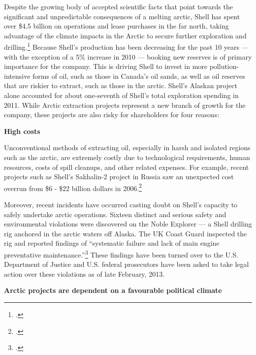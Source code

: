 Despite the growing body of accepted scientific facts that point towards the significant and unpredictable consequences of a melting arctic, Shell has spent over \$4.5 billion on operations and lease purchases in the far north, taking advantage of the climate impacts in the Arctic to secure further exploration and drilling.\footcite{ShellSuspends}
Because Shell's production has been decreasing for the past 10 years --- with the exception of a 5\% increase in 2010  --- booking new reserves is of primary importance for the company.
This is driving Shell to invest in more pollution-intensive forms of oil, such as those in Canada's oil sands, as well as oil reserves that are riskier to extract, such as those in the arctic.
Shell's Alaskan project alone accounted for about one-seventh of Shell's total exploration spending in 2011. 
While Arctic extraction projects represent a new branch of growth for the company, these projects are also risky for shareholders for four reasons:



\textbf{High costs} 



Unconventional methods of extracting oil, especially in harsh and isolated regions such as the arctic, are extremely costly due to technological requirements, human resources, costs of spill cleanups, and other related expenses. 
For example, recent projects such as Shell's Sakhalin-2 project in Russia saw an unexpected cost overrun from \$6 - \$22 billion dollars in 2006.\footcite[For more on these four central risk factors see][]{OutInTheCold_2012}



Moreover, recent incidents have occurred casting doubt on Shell's capacity to safely undertake arctic operations. 
Sixteen distinct and serious safety and environmental violations were discovered on the Noble Explorer --- a Shell drilling rig anchored in the arctic waters off Alaska. 
The UK Coast Guard inspected the rig and reported findings of ``systematic failure and lack of main engine preventative maintenance.''\footcite{RigFindings}
These findings have been turned over to the U.S. Department of Justice and U.S. federal prosecutors have been asked to take legal action over these violations as of late February, 2013. 



\textbf{Arctic projects are dependent on a favourable political climate}



